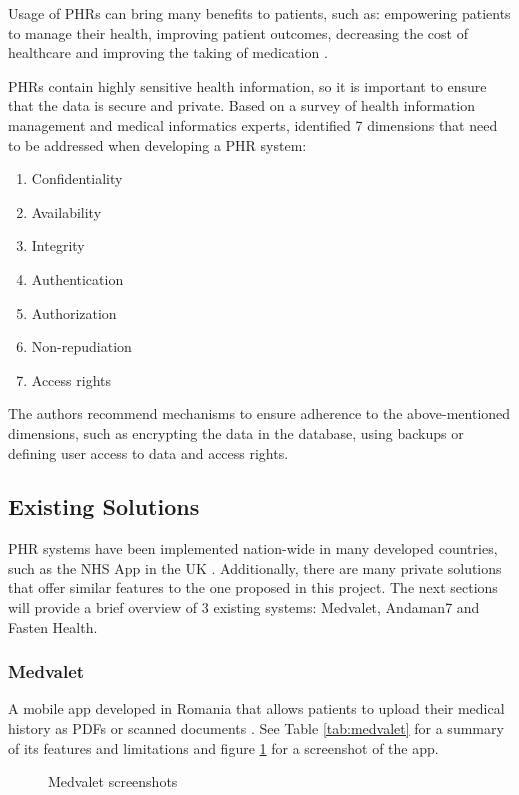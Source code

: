 Usage of PHRs can bring many benefits to patients, such as: empowering patients to manage their health, improving patient outcomes, decreasing the cost of healthcare and improving the taking of medication \parencite{phrsecurity}.

PHRs contain highly sensitive health information, so it is important to ensure that the data is secure and private. Based on a survey of health information management and medical informatics experts, \textcite{phrsecurity} identified 7 dimensions that need to be addressed when developing a PHR system:
\begin{enumerate}
    \item Confidentiality
    \item Availability
    \item Integrity
    \item Authentication
    \item Authorization
    \item Non-repudiation
    \item Access rights
\end{enumerate}

The authors recommend mechanisms to ensure adherence to the above-mentioned dimensions, such as encrypting the data in the database, using backups or defining user access to data and access rights.

\subsection{Existing Solutions}

PHR systems have been implemented nation-wide in many developed countries, such as the NHS App in the UK \parencite{phrlist}. Additionally, there are many private solutions that offer similar features to the one proposed in this project. The next sections will provide a brief overview of 3 existing systems: Medvalet, Andaman7 and Fasten Health.

\subsubsection{Medvalet}

A mobile app developed in Romania that allows patients to upload their medical history as PDFs or scanned documents \parencite{medvalet}. See Table \ref{tab:medvalet} for a summary of its features and limitations and figure \ref{fig:medvalet} for a screenshot of the app.

\begin{figure}[h!]
    \centering
     \quad
    \caption{Medvalet screenshots}
    \label{fig:medvalet}
\end{figure}

